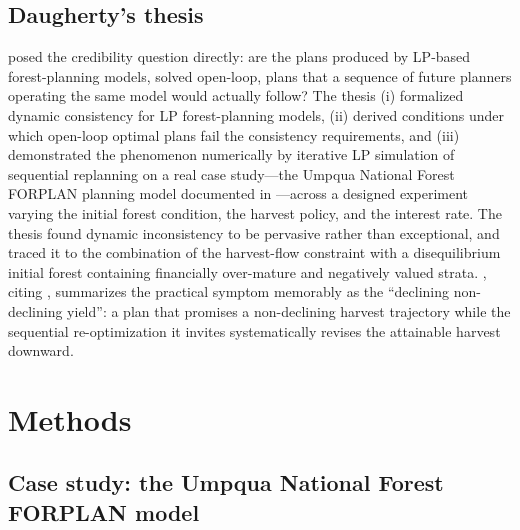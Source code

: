 \documentclass[12pt]{article}
\begin{document}
\hypertarget{daughertys-thesis}{%
\subsection{Daugherty's thesis}\label{daughertys-thesis}}

\citet{daugherty1991credibility} posed the credibility question directly: are the plans produced by LP-based forest-planning models, solved open-loop, plans that a sequence of future planners operating the same model would actually follow? The thesis (i) formalized dynamic consistency for LP forest-planning models, (ii) derived conditions under which open-loop optimal plans fail the consistency requirements, and (iii) demonstrated the phenomenon numerically by iterative LP simulation of sequential replanning on a real case study---the Umpqua National Forest FORPLAN planning model documented in \citep{usda1987umpqua}---across a designed experiment varying the initial forest condition, the harvest policy, and the interest rate. The thesis found dynamic inconsistency to be pervasive rather than exceptional, and traced it to the combination of the harvest-flow constraint with a disequilibrium initial forest containing financially over-mature and negatively valued strata. \citet[pp.~331--332]{gunn2007models}, citing \citet{daugherty1991credibility}, summarizes the practical symptom memorably as the ``declining non-declining yield'': a plan that promises a non-declining harvest trajectory while the sequential re-optimization it invites systematically revises the attainable harvest downward.

\section{Methods}

\hypertarget{case-study-the-umpqua-national-forest-forplan-model}{%
\subsection{Case study: the Umpqua National Forest FORPLAN model}\label{case-study-the-umpqua-national-forest-forplan-model}}
\end{document}
